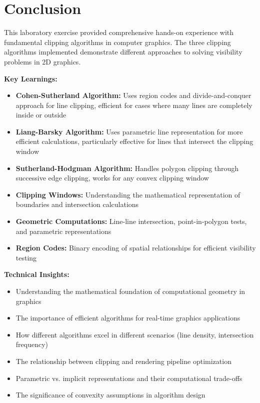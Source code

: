 \documentclass[12pt,a4paper]{article}
\begin{document}
\newpage
\section{Conclusion}

This laboratory exercise provided comprehensive hands-on experience with fundamental clipping algorithms in computer graphics. The three clipping algorithms implemented demonstrate different approaches to solving visibility problems in 2D graphics.

\textbf{Key Learnings:}
\begin{itemize}
    \item \textbf{Cohen-Sutherland Algorithm:} Uses region codes and divide-and-conquer approach for line clipping, efficient for cases where many lines are completely inside or outside
    \item \textbf{Liang-Barsky Algorithm:} Uses parametric line representation for more efficient calculations, particularly effective for lines that intersect the clipping window
    \item \textbf{Sutherland-Hodgman Algorithm:} Handles polygon clipping through successive edge clipping, works for any convex clipping window
    \item \textbf{Clipping Windows:} Understanding the mathematical representation of boundaries and intersection calculations
    \item \textbf{Geometric Computations:} Line-line intersection, point-in-polygon tests, and parametric representations
    \item \textbf{Region Codes:} Binary encoding of spatial relationships for efficient visibility testing
\end{itemize}

\textbf{Technical Insights:}
\begin{itemize}
    \item Understanding the mathematical foundation of computational geometry in graphics
    \item The importance of efficient algorithms for real-time graphics applications
    \item How different algorithms excel in different scenarios (line density, intersection frequency)
    \item The relationship between clipping and rendering pipeline optimization
    \item Parametric vs. implicit representations and their computational trade-offs
    \item The significance of convexity assumptions in algorithm design
\end{itemize}
\end{document}
